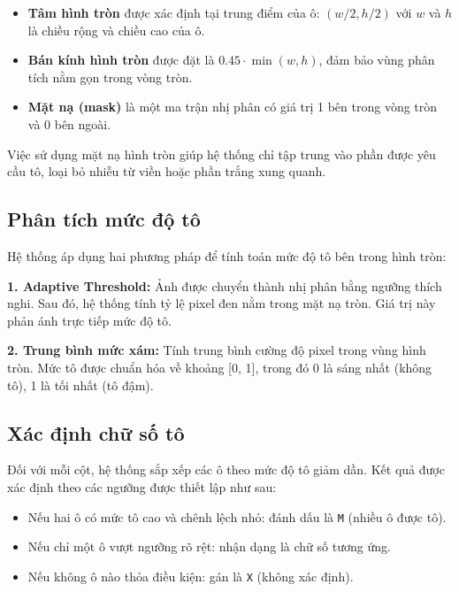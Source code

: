 \begin{itemize}
    \item \textbf{Tâm hình tròn} được xác định tại trung điểm của ô: $(w/2, h/2)$ với $w$ và $h$ là chiều rộng và chiều cao của ô.
    \item \textbf{Bán kính hình tròn} được đặt là $0.45 \cdot \min(w, h)$, đảm bảo vùng phân tích nằm gọn trong vòng tròn.
    \item \textbf{Mặt nạ (mask)} là một ma trận nhị phân có giá trị 1 bên trong vòng tròn và 0 bên ngoài.
\end{itemize}

Việc sử dụng mặt nạ hình tròn giúp hệ thống chỉ tập trung vào phần được yêu cầu tô, loại bỏ nhiễu từ viền hoặc phần trắng xung quanh.

\subsection*{Phân tích mức độ tô}

Hệ thống áp dụng hai phương pháp để tính toán mức độ tô bên trong hình tròn:

\vspace{0.5em}
\noindent
\textbf{1. Adaptive Threshold:}  
Ảnh được chuyển thành nhị phân bằng ngưỡng thích nghi. Sau đó, hệ thống tính tỷ lệ pixel đen nằm trong mặt nạ tròn. Giá trị này phản ánh trực tiếp mức độ tô.

\vspace{0.5em}
\noindent
\textbf{2. Trung bình mức xám:}  
Tính trung bình cường độ pixel trong vùng hình tròn. Mức tô được chuẩn hóa về khoảng [0, 1], trong đó 0 là sáng nhất (không tô), 1 là tối nhất (tô đậm).

\subsection*{Xác định chữ số tô}

Đối với mỗi cột, hệ thống sắp xếp các ô theo mức độ tô giảm dần. Kết quả được xác định theo các ngưỡng được thiết lập như sau:

\begin{itemize}
    \item Nếu hai ô có mức tô cao và chênh lệch nhỏ: đánh dấu là \texttt{M} (nhiều ô được tô).
    \item Nếu chỉ một ô vượt ngưỡng rõ rệt: nhận dạng là chữ số tương ứng.
    \item Nếu không ô nào thỏa điều kiện: gán là \texttt{X} (không xác định).
\end{itemize}

